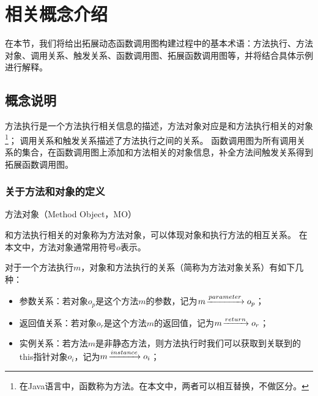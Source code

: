 \chapter{相关概念介绍}
\label{chp:definition}


在本节，我们将给出拓展动态函数调用图构建过程中的基本术语：方法执行、方法对象、调用关系、触发关系、函数调用图、拓展函数调用图等，并将结合具体示例进行解释。

\section{概念说明}
方法执行是一个方法执行相关信息的描述，方法对象对应是和方法执行相关的对象\footnote{在Java语言中，函数称为方法。在本文中，两者可以相互替换，不做区分。}；
调用关系和触发关系描述了方法执行之间的关系。
函数调用图为所有调用关系的集合，在函数调用图上添加和方法相关的对象信息，补全方法间触发关系得到拓展函数调用图。

\subsection{关于方法和对象的定义}

\begin{Def}
	方法对象（Method Object，MO）
\end{Def}

和方法执行相关的对象称为方法对象，可以体现对象和执行方法的相互关系。
在本文中，方法对象通常用符号$o$表示。
	

	对于一个方法执行$m$，对象和方法执行的关系（简称为方法对象关系）有如下几种：
	\begin{itemize}
				\setlength{\itemsep}{1pt}
				\setlength{\parskip}{0pt}
				\setlength{\parsep}{0pt}
		\item 参数关系：若对象$o_p$是这个方法$m$的参数，记为$m \joinrel\xrightarrow{parameter} o_p$；%
		\item 返回值关系：若对象$o_r$是这个方法$m$的返回值，记为$m \joinrel\xrightarrow{return} o_r$；%
		\item 实例关系：若方法$m$是非静态方法，则方法执行时我们可以获取到关联到的this指针对象$o_i$，记为$m \joinrel\xrightarrow{instance} o_i$；%
	\end{itemize}

